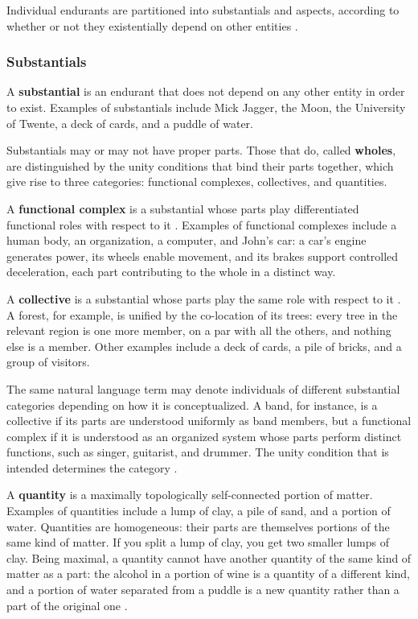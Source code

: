 Individual endurants are partitioned into substantials and aspects, according to whether or not they existentially depend on other entities \cite{ontological_foundations_for_structural_conceptual_models_2005}.

\subsubsection{Substantials}

A \textbf{substantial} is an endurant that does not depend on any other entity in order to exist. Examples of substantials include Mick Jagger, the Moon, the University of Twente, a deck of cards, and a puddle of water.

Substantials may or may not have proper parts. Those that do, called \textbf{wholes}, are distinguished by the unity conditions that bind their parts together, which give rise to three categories: functional complexes, collectives, and quantities.

A \textbf{functional complex} is a substantial whose parts play differentiated functional roles with respect to it \cite{guizzardi2009transitivity}. Examples of functional complexes include a human body, an organization, a computer, and John's car: a car's engine generates power, its wheels enable movement, and its brakes support controlled deceleration, each part contributing to the whole in a distinct way.

A \textbf{collective} is a substantial whose parts play the same role with respect to it \cite{guizzardi2011collectives}. A forest, for example, is unified by the co-location of its trees: every tree in the relevant region is one more member, on a par with all the others, and nothing else is a member. Other examples include a deck of cards, a pile of bricks, and a group of visitors.

The same natural language term may denote individuals of different substantial categories depending on how it is conceptualized. A band, for instance, is a collective if its parts are understood uniformly as band members, but a functional complex if it is understood as an organized system whose parts perform distinct functions, such as singer, guitarist, and drummer. The unity condition that is intended determines the category \cite{sales2017fleet}.

A \textbf{quantity} is a maximally topologically self-connected portion of matter. Examples of quantities include a lump of clay, a pile of sand, and a portion of water. Quantities are homogeneous: their parts are themselves portions of the same kind of matter. If you split a lump of clay, you get two smaller lumps of clay. Being maximal, a quantity cannot have another quantity of the same kind of matter as a part: the alcohol in a portion of wine is a quantity of a different kind, and a portion of water separated from a puddle is a new quantity rather than a part of the original one \cite{guizzardi2010fois}.

